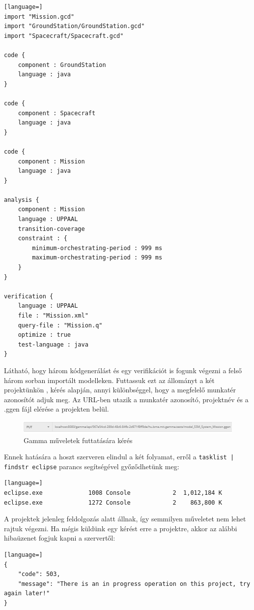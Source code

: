 \begin{lstlisting}[language=]
import "Mission.gcd"
import "GroundStation/GroundStation.gcd"
import "Spacecraft/Spacecraft.gcd"

code {
	component : GroundStation
	language : java
}

code {
	component : Spacecraft
	language : java
}

code {
	component : Mission
	language : java
}

analysis {
	component : Mission
	language : UPPAAL
	transition-coverage
	constraint : {
		minimum-orchestrating-period : 999 ms
		maximum-orchestrating-period : 999 ms
	}
}

verification {
	language : UPPAAL
	file : "Mission.xml"
	query-file : "Mission.q"
	optimize : true
	test-language : java
}
\end{lstlisting}
Látható, hogy három kódgenerálást és egy verifikációt is fogunk végezni a felső három sorban importált modelleken. Futtassuk ezt az állományt a két projektünkön ,  kérés alapján, annyi különbséggel, hogy a megfelelő munkatér azonosítót adjuk meg. Az URL-ben utazik a munkatér azonosító, projektnév és a .ggen fájl elérése a projekten belül.
\begin{figure}[!ht]
	\includegraphics[width=150mm, keepaspectratio]{figures/request_gamma_operation.PNG}
	\caption{Gamma műveletek futtatására kérés}
	\label{fig:request_gamma_operation}
\end{figure}

Ennek hatására a hoszt szerveren elindul a két folyamat, erről a \texttt{tasklist | findstr eclipse} parancs segítségével győződhetünk meg:
\begin{lstlisting}[language=]
eclipse.exe				1008 Console			2  1,012,184 K
eclipse.exe				1272 Console			2  	 863,800 K
\end{lstlisting}

A projektek jelenleg feldolgozás alatt állnak, így semmilyen műveletet nem lehet rajtuk végezni. Ha mégis küldünk egy kérést erre a projektre, akkor az alábbi hibaüzenet fogjuk kapni a szervertől:

\begin{lstlisting}[language=]
{
	"code": 503,
	"message": "There is an in progress operation on this project, try again later!"
}
\end{lstlisting}

